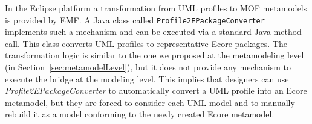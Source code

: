 In the Eclipse platform a transformation from UML profiles to MOF metamodels is provided by EMF. A Java class called \texttt{Profile2EPackageConverter} implements such a mechanism and  can be executed via a standard Java method call.
This class converts UML profiles to representative Ecore packages. The transformation logic is similar to the one we proposed at the metamodeling level (in Section~\ref{sec:metamodelLevel}), but it does not provide any mechanism to execute the bridge at the modeling level. This implies that designers can use \textit{Profile2EPackageConverter} to automatically convert a UML profile into an Ecore metamodel, but they are forced to consider each UML model and to manually rebuild it as a model conforming to the newly created Ecore metamodel. 
